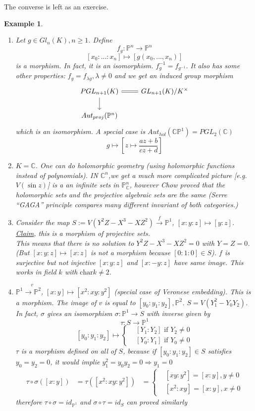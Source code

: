 \documentclass[11pt]{article}
\newtheorem{ex}[thm]{Example}
\newcommand{\proj}{\mathbb P}
\newcommand{\cplx}{\mathbb C}
\newcommand{\Lrta}{\Longrightarrow}
\newcommand{\lrta}{\longrightarrow}
\begin{document}
	The converse is left as an exercise.
	
	\begin{ex}
		\begin{enumerate}[label=(\arabic*)]
			\item Let $g\in Gl_n(K), n\geq 1$. Define 
			$$
			f_g:\proj^n\lrta \proj^n
			$$
			$$
			[x_0:...:x_n]\longmapsto [g(x_0,...,x_n)]
			$$
			is a morphism. In fact, it is an isomorphism. $f^{-1}_g=f_{g^{-1}}$.
			It also has some other properties: $f_{g}=f_{\lambda g},\lambda\neq 0$ and we get an induced group morphism
			\[
			\begin{tikzcd}
			PGL_{n+1}(K) \arrow[d] \arrow[r, equal] & GL_{n+1}(K)/K^\times \\
			Aut_{proj}(\proj^n) & 
			\end{tikzcd}
			\]
			which is an isomorphism. A special case is $Aut_{hol}(\cplx \proj^1)=PGL_2(\cplx)$
			$$
			g\longmapsto \left[z\mapsto \frac{az+b}{cz+d}\right]
			$$
			\item  $K=\cplx$. One can do  holomorphic geometry (using holomorphic functions instead of polynomials). IN $\cplx^n$,we get a  much more complicated picture [e.g. $V(\sin z)$] is a an infinite sets in $\proj^n_\cplx$, however Chow proved that the holomorphic sets and the projective algebraic sets are the same (Serre ``GAGA'' principle compares many different invariant of both categories.)
			\item Consider the map $S:=V(Y^2Z-X^3-XZ^2)\overset{f}{\lrta} \proj^1$, $[x:y:z]\mapsto [y:z]$. \\
			\underline{Claim}, this is a morphism of projective sets.
			\\
			This means that there is no solution to $Y^2Z-X^3-XZ^2=0$ with $Y=Z=0$. (But $[x:y:z]\mapsto [x:z]$ is not a morphism because $[0:1:0]\in S$). $f$ is surjective but not injective $[x:y:z]$ and $[x:-y:z]$ have same image. This works in field $k$ with $\text{char} k\neq 2$.
			\item $\proj^1\overset{v}{\lrta \proj^2}$, $[x:y]\mapsto [x^2:xy:y^2]$ (special case of Veronese embedding). This is a morphism. The image of $v$ is equal to $[y_0:y_1:y_2], \proj^2$. $S=V(Y_1^2-Y_0Y_2)$.  In fact, $\sigma$ gives an isomorphism
			$\sigma: \proj^1\lrta S$ with inverse given by 
			$$
			\tau: S\lrta \proj^1
			$$
			$$
			[y_0:y_1:y_2]\mapsto\left\{\begin{matrix*}
			&[Y_1:Y_2] \text{ if } Y_2\neq 0\\
			&[Y_0:Y_1]\text{ if } Y_0\neq 0
			\end{matrix*}
			\right.
			$$
			$\tau$ is a morphism defined on all of $S$, because if $[y_0:y_1:y_2]\in S$ satisfies $y_0=y_2=0$, it would implie $y^2_1=y_0y_2=0\Lrta y_1=0$ 
			$$
			\begin{aligned}
			\tau\circ \sigma([x:y])&=\tau([x^2:xy:y^2])
			&=\left\{\begin{matrix*}
			&[xy:y^2]=[x:y], y\neq 0
			\\
			&[x^2:xy]=[x:y], x\neq 0
			\end{matrix*}\right.
			\end{aligned}
			$$
			therefore $\tau\circ \sigma= id_{\proj^1}$ and $\sigma\circ \tau=id_S$ can proved similarly
			

\end{enumerate}
\end{ex}
\end{document}
